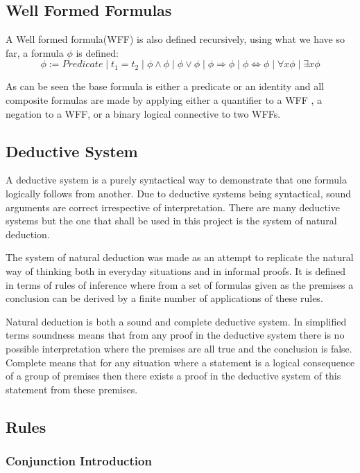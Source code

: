 {\subsection*{Well Formed Formulas}

A Well formed formula(WFF) is also defined recursively, using what we have so far, a formula $\phi$ is defined: 
$$ \phi := Predicate \mid t_1 = t_2 \mid \phi \land \phi \mid \phi \lor \phi \mid \phi \Rightarrow \phi \mid \phi \Leftrightarrow \phi \mid \forall x \phi \mid \exists x \phi$$

As can be seen the base formula is either a predicate or an identity and all composite formulas are made by applying either a quantifier to a WFF , a negation to a WFF, or a binary logical connective to two WFFs.

\subsection{Deductive System}

A deductive system is a purely syntactical way to demonstrate that one formula logically follows from another. Due to deductive systems being syntactical, sound arguments are correct irrespective of interpretation. There are many deductive systems but the one that shall be used in this project is the system of natural deduction.

The system of natural deduction was made as an attempt to replicate the natural way of thinking both in everyday situations and in informal proofs. It is defined in terms of rules of inference where from a set of formulas given as the premises a conclusion can be derived by a finite number of applications of these rules.

Natural deduction is both a sound and complete deductive system. In simplified terms soundness means that from any proof in the deductive system there is no possible interpretation where the premises are all true and the conclusion is false. Complete means that for any situation where a statement is a logical consequence of a group of premises then there exists a proof in the deductive system of this statement from these premises.


\subsection{Rules}

\subsubsection{Conjunction Introduction}

}
